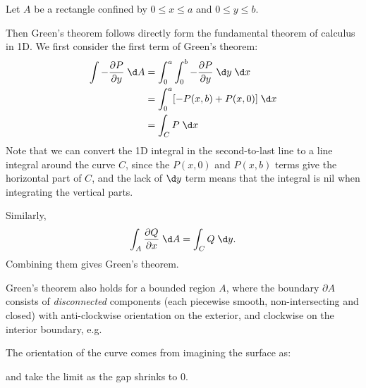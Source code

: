 \documentclass[a4paper]{article}
\begin{document}
\begin{eg}
  Let $A$ be a rectangle confined by $0 \leq x \leq a$ and $0 \leq y \leq b$.
  \begin{center}
  \end{center}
  Then Green's theorem follows directly form the fundamental theorem of calculus in 1D. We first consider the first term of Green's theorem:
  \begin{align*}
    \int -\frac{\partial P}{\partial y} \;\d A &= \int_0^a \int_0^b -\frac{\partial P}{\partial y}\;\d y\;\d x\\
    &= \int_0^a [-P(x, b) + P(x, 0)]\;\d x\\
    &= \int_C P\;\d x
  \end{align*}
  Note that we can convert the 1D integral in the second-to-last line to a line integral around the curve $C$, since the $P(x, 0)$ and $P(x, b)$ terms give the horizontal part of $C$, and the lack of $\d y$ term means that the integral is nil when integrating the vertical parts.

  Similarly,
  \[
    \int_A \frac{\partial Q}{\partial x}\;\d A = \int_C Q\;\d y.
  \]
  Combining them gives Green's theorem.
\end{eg}

Green's theorem also holds for a bounded region $A$, where the boundary $\partial A$ consists of \emph{disconnected} components (each piecewise smooth, non-intersecting and closed) with anti-clockwise orientation on the exterior, and clockwise on the interior boundary, e.g.
\begin{center}
\end{center}
The orientation of the curve comes from imagining the surface as:
\begin{center}
\end{center}
and take the limit as the gap shrinks to 0.
\end{document}
